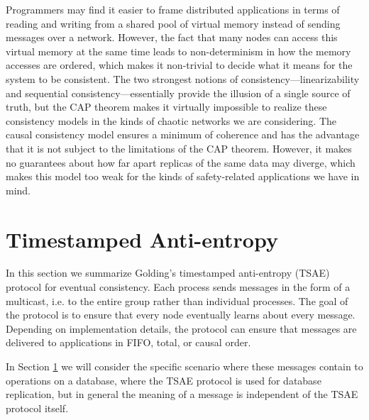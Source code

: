 \documentclass[]             %
{NASA}                       %
\theoremstyle{definition}
\begin{document}
Programmers may find it easier to frame distributed applications in
terms of reading and writing from a shared pool of virtual memory
instead of sending messages over a network. However, the fact that
many nodes can access this virtual memory at the same time leads to
non-determinism in how the memory accesses are ordered, which makes it
non-trivial to decide what it means for the system to be
consistent. The two strongest notions of consistency---linearizability
and sequential consistency---essentially provide the illusion of a
single source of truth, but the CAP theorem makes it virtually
impossible to realize these consistency models in the kinds of chaotic
networks we are considering. The causal consistency model ensures a
minimum of coherence and has the advantage that it is not subject to
the limitations of the CAP theorem. However, it makes no guarantees
about how far apart replicas of the same data may diverge, which makes
this model too weak for the kinds of safety-related applications we
have in mind.

\section{Timestamped Anti-entropy}

\newcommand{\ack}[2]{\textsf{ack}_{#1}\left(#2\right)}
\newcommand{\summary}[2]{\textsf{summary}_{#1}\left(#2\right)}
\newcommand{\summaryVec}[2]{\textsf{summary}_{#1}}
\newcommand{\commitline}[1]{\textsf{commit}_{#1}}
\newcommand{\globalcommit}{\textsf{globalcommit}}
\newcommand{\knowncommit}[1]{\textsf{purgeline}_{#1}}
\newcommand{\WL}[1]{\textsf{WL}_{#1}}
\newcommand{\WLat}[2]{\textsf{WL}_{#1}\left(#2\right)}
\newcommand{\W}{\textbf{\textsf{Writes}}}
\newcommand{\Unseen}[1]{\textsf{Unseen}_{#1}}
\newcommand{\UnseenEst}[2]{\textsf{EstUnseen}_{#1}{\left(#2\right)}}
\newcommand{\AllProc}{\mathcal{P}}
\newcommand{\currenttime}[1]{\textsf{currenttime}_{#1}}

In this section we summarize Golding's timestamped anti-entropy (TSAE)
protocol for eventual consistency. Each process sends messages in the
form of a multicast, i.e. to the entire group rather than individual
processes. The goal of the protocol is to ensure that every node
eventually learns about every message. Depending on implementation
details, the protocol can ensure that messages are delivered to
applications in FIFO, total, or causal order.

In Section \ref{} we will consider the specific scenario where these
messages contain to operations on a database, where the TSAE protocol
is used for database replication, but in general the meaning of a
message is independent of the TSAE protocol itself.
\end{document}
